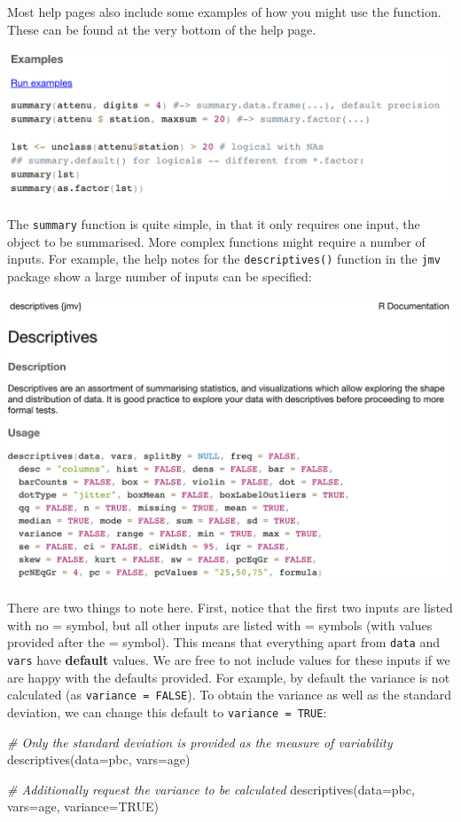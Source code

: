 \documentclass[
]{memoir}
\newenvironment{Shaded}{\begin{snugshade}}{\end{snugshade}}
\newcommand{\AttributeTok}[1]{\textcolor[rgb]{0.77,0.63,0.00}{#1}}
\newcommand{\CommentTok}[1]{\textcolor[rgb]{0.56,0.35,0.01}{\textit{#1}}}
\newcommand{\ConstantTok}[1]{\textcolor[rgb]{0.00,0.00,0.00}{#1}}
\newcommand{\FunctionTok}[1]{\textcolor[rgb]{0.00,0.00,0.00}{#1}}
\newcommand{\NormalTok}[1]{#1}
\begin{document}
Most help pages also include some examples of how you might use the function. These can be found at the very bottom of the help page.

\includegraphics[width=0.8\linewidth]{img/help-2}

The \texttt{summary} function is quite simple, in that it only requires one input, the object to be summarised. More complex functions might require a number of inputs. For example, the help notes for the \texttt{descriptives()} function in the \texttt{jmv} package show a large number of inputs can be specified:

\includegraphics[width=0.8\linewidth]{img/help-3}

There are two things to note here. First, notice that the first two inputs are listed with no = symbol, but all other inputs are listed with = symbols (with values provided after the = symbol). This means that everything apart from \texttt{data} and \texttt{vars} have \textbf{default} values. We are free to not include values for these inputs if we are happy with the defaults provided. For example, by default the variance is not calculated (as \texttt{variance\ =\ FALSE}). To obtain the variance as well as the standard deviation, we can change this default to \texttt{variance\ =\ TRUE}:

\begin{Shaded}
\begin{Highlighting}[]
\CommentTok{\# Only the standard deviation is provided as the measure of variability}
\FunctionTok{descriptives}\NormalTok{(}\AttributeTok{data=}\NormalTok{pbc, }\AttributeTok{vars=}\NormalTok{age)}

\CommentTok{\# Additionally request the variance to be calculated}
\FunctionTok{descriptives}\NormalTok{(}\AttributeTok{data=}\NormalTok{pbc, }\AttributeTok{vars=}\NormalTok{age, }\AttributeTok{variance=}\ConstantTok{TRUE}\NormalTok{)}
\end{Highlighting}
\end{Shaded}
\end{document}
